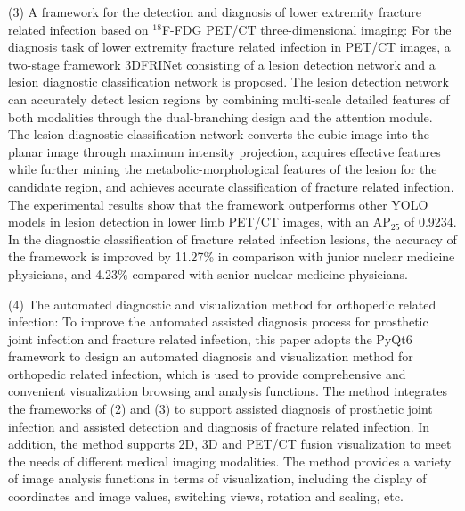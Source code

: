 \begin{eabstract}
    (3) A framework for the detection and diagnosis of lower extremity fracture related infection based on \(^{18}\)F-FDG PET/CT three-dimensional imaging: For the diagnosis task of lower extremity fracture related infection in PET/CT images, a two-stage framework 3DFRINet consisting of a lesion detection network and a lesion diagnostic classification network is proposed. The lesion detection network can accurately detect lesion regions by combining multi-scale detailed features of both modalities through the dual-branching design and the attention module. The lesion diagnostic classification network converts the cubic image into the planar image through maximum intensity projection, acquires effective features while further mining the metabolic-morphological features of the lesion for the candidate region, and achieves accurate classification of fracture related infection. The experimental results show that the framework outperforms other YOLO models in lesion detection in lower limb PET/CT images, with an AP\(_{25}\) of 0.9234. In the diagnostic classification of fracture related infection lesions, the accuracy of the framework is improved by 11.27\% in comparison with junior nuclear medicine physicians, and 4.23\% compared with senior nuclear medicine physicians.

    (4) The automated diagnostic and visualization method for orthopedic related infection: To improve the automated assisted diagnosis process for prosthetic joint infection and fracture related infection, this paper adopts the PyQt6 framework to design an automated diagnosis and visualization method for orthopedic related infection, which is used to provide comprehensive and convenient visualization browsing and analysis functions. The method integrates the frameworks of (2) and (3) to support assisted diagnosis of prosthetic joint infection and assisted detection and diagnosis of fracture related infection. In addition, the method supports 2D, 3D and PET/CT fusion visualization to meet the needs of different medical imaging modalities. The method provides a variety of image analysis functions in terms of visualization, including the display of coordinates and image values, switching views, rotation and scaling, etc.

\end{eabstract}

